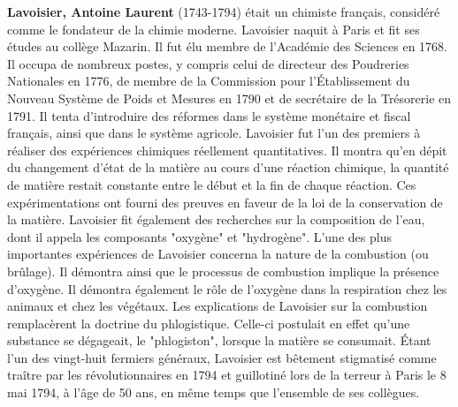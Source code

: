 \textbf{Lavoisier, Antoine Laurent} (1743-1794) était un chimiste français, considéré comme le fondateur de la chimie moderne. Lavoisier naquit à Paris et fit ses études au collège Mazarin. Il fut élu membre de l'Académie des Sciences en 1768. Il occupa de nombreux postes, y compris celui de directeur des Poudreries Nationales en 1776, de membre de la Commission pour l'Établissement du Nouveau Système de Poids et Mesures en 1790 et de secrétaire de la Trésorerie en 1791. Il tenta d'introduire des réformes dans le système monétaire et fiscal français, ainsi que dans le système agricole. Lavoisier fut l'un des premiers à réaliser des expériences chimiques réellement quantitatives. Il montra qu'en dépit du changement d'état de la matière au cours d'une réaction chimique, la quantité de matière restait constante entre le début et la fin de chaque réaction. Ces expérimentations ont fourni des preuves en faveur de la loi de la conservation de la matière. Lavoisier fit également des recherches sur la composition de l'eau, dont il appela les composants "oxygène" et "hydrogène". L'une des plus importantes expériences de Lavoisier concerna la nature de la combustion (ou brûlage). Il démontra ainsi que le processus de combustion implique la présence d'oxygène. Il démontra également le rôle de l'oxygène dans la respiration chez les animaux et chez les végétaux. Les explications de Lavoisier sur la combustion remplacèrent la doctrine du phlogistique. Celle-ci postulait en effet qu'une substance se dégageait, le "phlogiston", lorsque la matière se consumait. Étant l'un des vingt-huit fermiers généraux, Lavoisier est bêtement stigmatisé comme traître par les révolutionnaires en 1794 et guillotiné lors de la terreur à Paris le 8 mai 1794, à l'âge de 50 ans, en même temps que l'ensemble de ses collègues.

